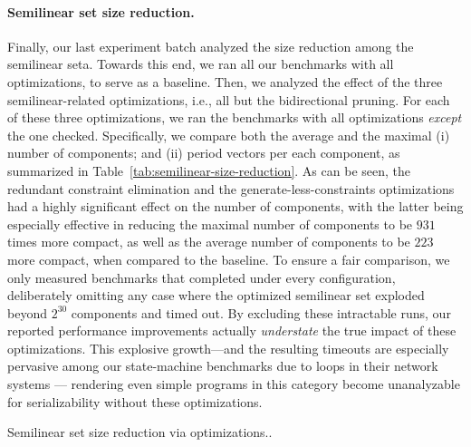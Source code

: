 \paragraph{Semilinear set size reduction.}

Finally, our last experiment batch analyzed the size reduction among the semilinear seta.
%
Towards this end, we ran all our benchmarks with all optimizations, to serve as a baseline. 
%
Then, we analyzed the effect of the three semilinear-related optimizations, i.e., all but the bidirectional pruning. For each of these three optimizations, we ran the benchmarks with all optimizations \textit{except} the one checked.
%
%
Specifically, we compare both the average and the maximal (i) number of components; and (ii) period vectors per each component, as summarized in Table~\ref{tab:semilinear-size-reduction}.
%
As can be seen, the redundant constraint elimination and the generate-less-constraints optimizations had a highly significant effect on the number of components, with the latter being especially effective in reducing the maximal number of components to be $931$ times more compact, as well as the average number of components to be $223$ more compact, when compared to the baseline.
%
To ensure a fair comparison, we only measured benchmarks that completed under every configuration, deliberately omitting any case where the optimized semilinear set exploded beyond $2^{30}$ components and timed out. By excluding these intractable runs, our reported performance improvements actually \textit{understate} the true impact of these optimizations. This explosive growth—and the resulting timeouts are especially pervasive among our state-machine benchmarks due to loops in their network systems --- rendering even simple programs in this category become unanalyzable for serializability without these optimizations.




\begin{table}[htbp]
	\centering
	
	\caption{Semilinear set size reduction via optimizations..}
	\label{tab:semilinear-size-reduction}
\end{table}





